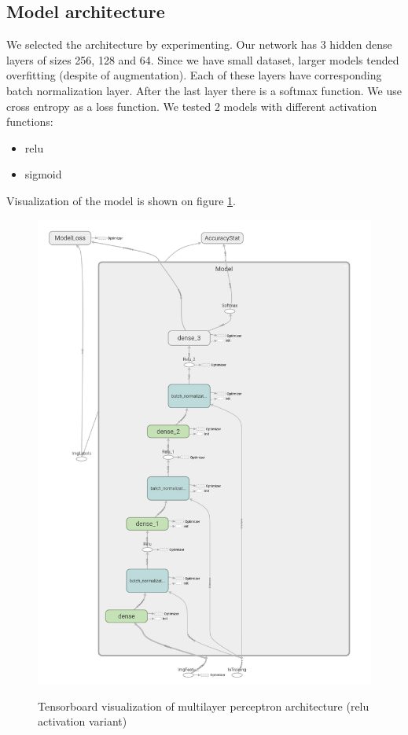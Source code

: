 \documentclass[a4paper]{article}
\begin{document}
\subsection{Model architecture}
We selected the architecture by experimenting.
Our network has 3 hidden dense layers of sizes 256, 128 and 64.
Since we have small dataset, larger models tended overfitting
(despite of augmentation).
Each of these layers have corresponding batch normalization layer.
After the last layer there is a softmax function.
We use cross entropy as a loss function.
We tested 2 models with different activation functions:
\begin{itemize}
    \item relu
    \item sigmoid
\end{itemize}
Visualization of the model is shown on figure \ref{fig:arch}.

\begin{figure}[h]
    \caption[]{Tensorboard visualization of multilayer perceptron architecture (relu activation variant)}
    \centering
    \includegraphics[page=2,width=1.0\textwidth]{architecture.png}
    \label{fig:arch}
\end{figure}
\end{document}
